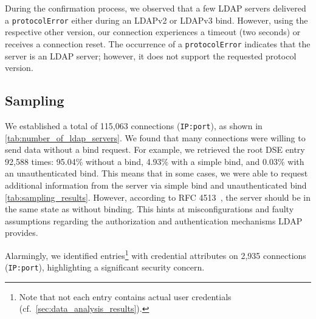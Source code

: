During the confirmation process, we observed that a few LDAP servers delivered a \texttt{protocolError} either during an LDAPv2 or LDAPv3 bind. However, using the respective other version, our connection experiences a timeout (two seconds) or receives a connection reset. The occurrence of a \texttt{protocolError} indicates that the server is an LDAP server; however, it does not support the requested protocol version.



\subsection{Sampling}


We established a total of 115,063 connections (\texttt{IP:port}), as shown in \cref{tab:number_of_ldap_servers}. We found that many connections were willing to send data without a bind request. For example, we retrieved the root \gls{DSE} entry 92,588 times: 95.04\% without a bind, 4.93\% with a simple bind, and 0.03\% with an unauthenticated bind. This means that in some cases, we were able to request additional information from the server via simple bind and unauthenticated bind \cref{tab:sampling_results}. However, according to RFC 4513~\cite{rfc4513}, the server should be in the same state as without binding. This hints at misconfigurations and faulty assumptions regarding the authorization and authentication mechanisms \gls{LDAP} provides.

Alarmingly, we identified entries\footnote{Note that not each entry contains actual user credentials (cf.~\cref{sec:data_analysis_results}).} with credential attributes on 2,935 connections (\texttt{IP:port}), highlighting a significant security concern. 



